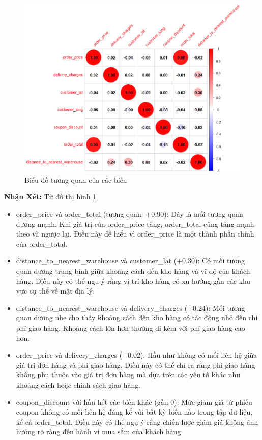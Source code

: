 \begin{figure}[!htbp]
    \centering
    \includegraphics[width=0.8\linewidth]{graphics/tq.jpg}
    \caption{Biểu đồ tương quan của các biến}
    \label{fig:4.9}
\end{figure}
\newpage
\textbf{Nhận Xét:} Từ đồ thị hình \ref{fig:4.9}
\begin{itemize}
    \item order\_price và order\_total (tương quan: +0.90):
    Đây là mối tương quan dương mạnh. Khi giá trị của order\_price tăng, order\_total cũng tăng mạnh theo và ngược lại. Điều này dễ hiểu vì order\_price là một thành phần chính của order\_total.
    
    \item distance\_to\_nearest\_warehouse và customer\_lat (+0.30):
    Có mối tương quan dương trung bình giữa khoảng cách đến kho hàng và vĩ độ của khách hàng. Điều này có thể ngụ ý rằng vị trí kho hàng có xu hướng gần các khu vực cụ thể về mặt địa lý.
    
    \item distance\_to\_nearest\_warehouse và delivery\_charges (+0.24):
    Mối tương quan dương nhẹ cho thấy khoảng cách đến kho hàng có tác động nhỏ đến chi phí giao hàng. Khoảng cách lớn hơn thường đi kèm với phí giao hàng cao hơn.
    
    \item order\_price và delivery\_charges (+0.02):
    Hầu như không có mối liên hệ giữa giá trị đơn hàng và phí giao hàng. Điều này có thể chỉ ra rằng phí giao hàng không phụ thuộc vào giá trị đơn hàng mà dựa trên các yếu tố khác như khoảng cách hoặc chính sách giao hàng.
    
    \item coupon\_discount với hầu hết các biến khác (gần 0):
    Mức giảm giá từ phiếu coupon không có mối liên hệ đáng kể với bất kỳ biến nào trong tập dữ liệu, kể cả order\_total. Điều này có thể ngụ ý rằng chiến lược giảm giá không ảnh hưởng rõ ràng đến hành vi mua sắm của khách hàng.
\end{itemize}
